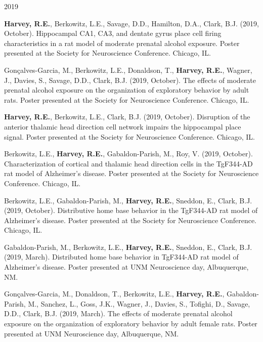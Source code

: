 \begin{cventries}
\cventry
    {} %
    {} %
    {} %
    {2019} %
    {
      \begin{cvitems} %
      \setlength\itemsep{0.35em}
        \item {\textbf{Harvey, R.E.}, Berkowitz, L.E., Savage, D.D., Hamilton, D.A., Clark, B.J. (2019, October). Hippocampal CA1, CA3, and dentate gyrus place cell firing characteristics in a rat model of moderate prenatal alcohol exposure. Poster presented at the Society for Neuroscience Conference. Chicago, IL.} 
        \item {Gon\c{c}alves-Garcia, M., Berkowitz, L.E., Donaldson, T., \textbf{Harvey, R.E.}, Wagner, J., Davies, S., Savage, D.D., Clark, B.J. (2019, October). The effects of moderate prenatal alcohol exposure on the organization of exploratory behavior by adult rats. Poster presented at the Society for Neuroscience Conference. Chicago, IL.}
        \item {\textbf{Harvey, R.E.}, Berkowitz, L.E., Clark, B.J. (2019, October). Disruption of the anterior thalamic head direction cell network impairs the hippocampal place signal. Poster presented at the Society for Neuroscience Conference. Chicago, IL.}
        \item {Berkowitz, L.E., \textbf{Harvey, R.E.}, Gabaldon-Parish, M., Roy, V. (2019, October). Characterization of cortical and thalamic head direction cells in the TgF344-AD rat model of Alzheimer’s disease. Poster presented at the Society for Neuroscience Conference. Chicago, IL.}
        \item {Berkowitz, L.E., Gabaldon-Parish, M., \textbf{Harvey, R.E.}, Sneddon, E., Clark, B.J. (2019, October). Distributive home base behavior in the TgF344-AD rat model of Alzheimer’s disease. Poster presented at the Society for Neuroscience Conference. Chicago, IL.}
        \item {Gabaldon-Parish, M., Berkowitz, L.E., \textbf{Harvey, R.E.}, Sneddon, E., Clark, B.J. (2019, March). Distributed home base behavior in TgF344-AD rat model of Alzheimer’s disease. Poster presented at UNM Neuroscience day, Albuquerque, NM.}
        \item {Gon\c{c}alves-Garcia, M., Donaldson, T., Berkowitz, L.E., \textbf{Harvey, R.E.}, Gabaldon-Parish, M., Sanchez, L., Goss, J.K., Wagner, J., Davies, S., Tofighi, D., Savage, D.D., Clark, B.J. (2019, March). The effects of moderate prenatal alcohol exposure on the organization of exploratory behavior by adult female rats. Poster presented at UNM Neuroscience day, Albuquerque, NM.}
      \end{cvitems}
    }
\end{cventries}

